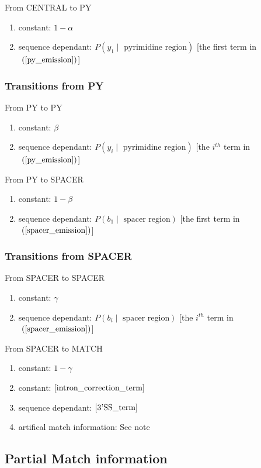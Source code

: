 From CENTRAL to PY
\begin{enumerate}
\item constant: $1-\alpha$
\item sequence dependant: $P(y_1 \; | \; \mbox{ pyrimidine region})$ [the first term in$~(\ref{py_emission})$]
\end{enumerate}

\subsubsection{Transitions from PY}
From PY to PY
\begin{enumerate}
\item constant: $\beta$
\item sequence dependant: $P(y_i \; | \; \mbox{ pyrimidine region})$ [the $i^{th}$ term in$~(\ref{py_emission})$]
\end{enumerate}

From PY to SPACER
\begin{enumerate}
\item constant: $1-\beta$
\item sequence dependant: $P(b_1 \; | \; \mbox{ spacer region})$ [the first term in$~(\ref{spacer_emission})$]
\end{enumerate}

\subsubsection{Transitions from SPACER}

From SPACER to SPACER
\begin{enumerate}
\item constant: $\gamma$
\item sequence dependant: $P(b_i \; | \; \mbox{ spacer region})$ [the $i^{th}$ term in$~(\ref{spacer_emission})$]
\end{enumerate}


From SPACER to MATCH
\begin{enumerate}
\item constant: $1-\gamma$
\item constant: $\ref{intron_correction_term}$
\item sequence dependant: $\ref{3'SS_term}$
\item artifical match information: See note
\end{enumerate}



\subsection{Partial Match information}

